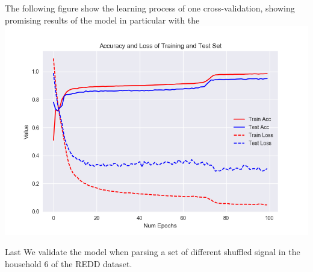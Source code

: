 \documentclass{article}
\begin{document}
    The following figure show the learning process of one cross-validation,
showing promising results of the model in particular with the
\includegraphics{plot1_convlstm.png}

Last We validate the model when parsing a set of different shuffled
signal in the household 6 of the REDD dataset.
\end{document}
